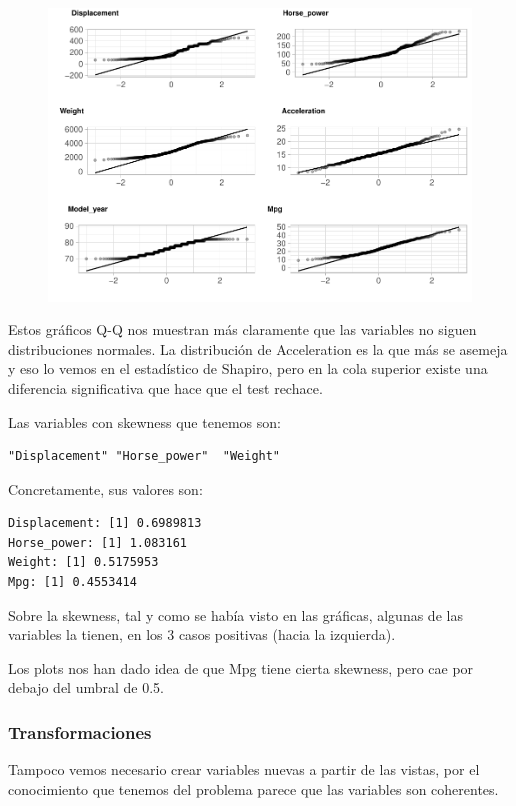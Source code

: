 \begin{figure}[H]\includegraphics[width=.9\linewidth]{img/EDA_files/figure-latex/unnamed-chunk-14-7} \caption{}\end{figure}

Estos gráficos Q-Q nos muestran más claramente que las variables no siguen distribuciones normales. La distribución de Acceleration es la que más se asemeja y eso lo vemos en el estadístico de Shapiro, pero en la cola superior existe una diferencia significativa que hace que el test rechace.

Las variables con skewness que tenemos son:

\begin{verbatim}
"Displacement" "Horse_power"  "Weight"      
\end{verbatim}

Concretamente, sus valores son:

\begin{verbatim}
Displacement: [1] 0.6989813
Horse_power: [1] 1.083161
Weight: [1] 0.5175953
Mpg: [1] 0.4553414
\end{verbatim}

Sobre la skewness, tal y como se había visto en las gráficas, algunas de las variables la tienen, en los 3 casos positivas (hacia la izquierda).

Los plots nos han dado idea de que Mpg tiene cierta skewness, pero cae por debajo del umbral de 0.5.

\subsubsection{Transformaciones}

Tampoco vemos necesario crear variables nuevas a partir de las vistas, por el conocimiento que tenemos del problema parece que las variables son coherentes.

